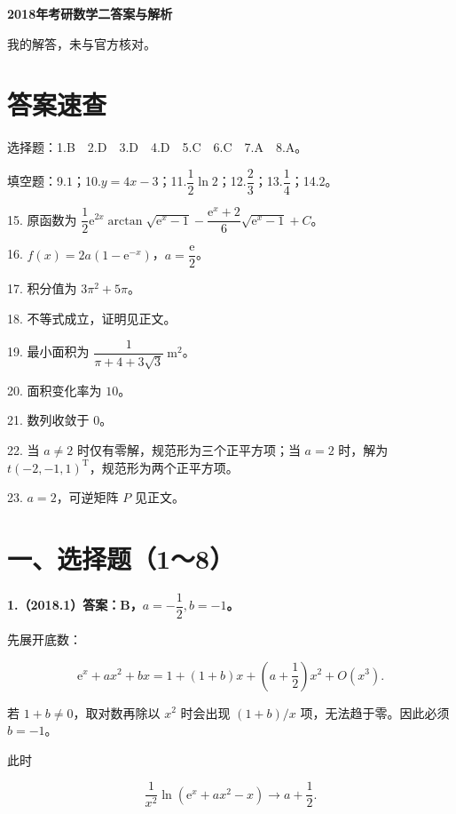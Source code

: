\documentclass[UTF8,11pt,fontset=windows]{ctexart}
\begin{document}
{\LARGE\bfseries 2018年考研数学二答案与解析\par}\vspace{6pt}

\begingroup\color{gray}我的解答，未与官方核对。\par\endgroup

\section*{答案速查}

\begingroup\color{gray}选择题：1.B　2.D　3.D　4.D　5.C　6.C　7.A　8.A。\par\endgroup

\begingroup\color{gray}填空题：9.$1$；10.$y=4x-3$；11.$\dfrac12\ln2$；12.$\dfrac23$；13.$\dfrac14$；14.$2$。\par\endgroup

15. 原函数为 $\dfrac12\mathrm e^{2x}\arctan\sqrt{\mathrm e^x-1}-\dfrac{\mathrm e^x+2}{6}\sqrt{\mathrm e^x-1}+C$。

16. $f(x)=2a(1-\mathrm e^{-x})$，$a=\dfrac{\mathrm e}{2}$。

17. 积分值为 $3\pi^2+5\pi$。

18. 不等式成立，证明见正文。

19. 最小面积为 $\dfrac1{\pi+4+3\sqrt3}\ \mathrm{m}^2$。

20. 面积变化率为 $10$。

21. 数列收敛于 $0$。

22. 当 $a\ne2$ 时仅有零解，规范形为三个正平方项；当 $a=2$ 时，解为 $t(-2,-1,1)^{\mathrm T}$，规范形为两个正平方项。

23. $a=2$，可逆矩阵 $P$ 见正文。

\clearpage

\section*{一、选择题（1～8）}

\textbf{1.（2018.1）答案：B，$a=-\dfrac12,b=-1$。}

先展开底数：

$$
\mathrm e^x+ax^2+bx
=1+(1+b)x+\left(a+\frac12\right)x^2+O(x^3).
$$

若 $1+b\ne0$，取对数再除以 $x^2$ 时会出现 $(1+b)/x$ 项，无法趋于零。因此必须 $b=-1$。

此时

$$
\frac1{x^2}\ln(\mathrm e^x+ax^2-x)
\longrightarrow a+\frac12.
$$
\end{document}
